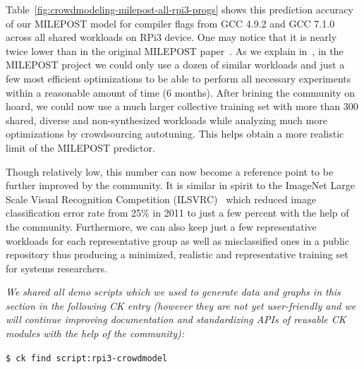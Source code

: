 Table~\ref{fig:crowdmodeling-milepost-all-rpi3-progs} shows this prediction accuracy
of our MILEPOST model for compiler flags from GCC 4.9.2 and GCC 7.1.0 
across all shared workloads on RPi3 device.
%
One may notice that it is nearly twice lower than in the
original MILEPOST
paper~\cite{29db2248aba45e59:a31e374796869125}.
%
As we explain in~\cite{cm:29db2248aba45e59:cd11e3a188574d80},
in the MILEPOST project we could only use a dozen of similar
workloads and just a few most efficient optimizations to be
able to perform all necessary experiments within a reasonable
amount of time (6 months).
%
After brining the community on hoard, we could now use a much larger 
collective training set with more than 300 shared, diverse 
and non-synthesized workloads while analyzing much more optimizations 
by crowdsourcing autotuning.
%
This helps obtain a more realistic limit of the MILEPOST predictor.

Though relatively low, this number can now become a 
reference point to be further improved by the community.
%
It is similar in spirit to the ImageNet Large Scale Visual Recognition Competition
(ILSVRC)~\cite{DBLP:journals/corr/RussakovskyDSKSMHKKBBF14}
which reduced image classification error rate from 25\%
in 2011 to just a few percent with the help of the community.
%
Furthermore, we can also keep just a few representative
workloads for each representative group as well as misclassified ones in
a public repository thus producing a minimized, realistic and
representative training set for systems researchers.

\textit{We shared all demo scripts which we used to generate data and
graphs in this section in the following CK entry (however they are not yet
user-friendly and we will continue improving documentation and
standardizing APIs of reusable CK modules with the help of the community):}

\begin{flushleft}
\texttt{\$ ck find script:rpi3-crowdmodel}
\end{flushleft}
